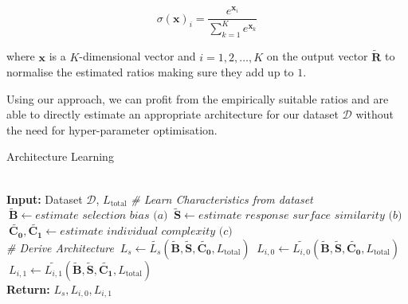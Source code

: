\begin{equation}
\sigma(\mathbf{x})_i = \frac{e^{\mathbf{x}_i}}{\sum_{k=1}^{K}e^{\mathbf{x}_k}}
\end{equation}

where $\mathbf{x}$ is a $K$-dimensional vector and $i = 1, 2, \dots, K$ on the output vector $\tilde{\mathbf{R}}$ to normalise the estimated ratios making sure they add up to $1$. 



Using our approach, we can profit from the empirically suitable ratios and are able to directly estimate an appropriate architecture for our dataset $\mathcal{D}$ without the need for hyper-parameter optimisation.  



\begin{algorithm}
	\caption{Architecture Learning}\label{fig:algorithm}
	\begin{algorithmic}[1]
		
		 \\
		\textbf{Input:} Dataset $\mathcal{D}$, $L_{\text{total}}$  
		\State \emph{\# Learn Characteristics from dataset}
		\State $\ \tilde{\mathbf{B}} \gets \textit{estimate selection bias (a)}$
		\State $\ \tilde{\mathbf{S}} \gets \textit{estimate response surface similarity (b)}$
		\State $\ \tilde{\mathbf{C_0}}, \tilde{\mathbf{C_1}} \gets \textit{estimate individual complexity (c)}$\\
		\State \emph{\# Derive Architecture}
		\State $\ {L_s} \gets \tilde{L_s}(\tilde{\mathbf{B}}, \tilde{\mathbf{S}}, \tilde{\mathbf{C_0}}, L_{\text{total}})$
		\State $\ {L_{i,0}}\gets \tilde{L_{i,0}}(\tilde{\mathbf{B}}, \tilde{\mathbf{S}}, \tilde{\mathbf{C_0}}, L_{\text{total}})$
		\State $\ {L_{i,1}}\gets \tilde{L_{i,1}}(\tilde{\mathbf{B}}, \tilde{\mathbf{S}}, \tilde{\mathbf{C_1}}, L_{\text{total}})$ \\
		\textbf{Return:} $L_s, L_{i,0}, L_{i,1}$ 
		
		\EndProcedure
	\end{algorithmic}
\end{algorithm}

	